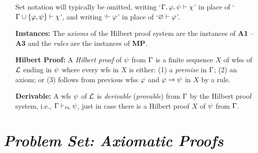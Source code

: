 \documentclass[a4paper, 11pt]{article} %
\begin{document}
\begin{enumerate}[leftmargin=1.2in,labelsep=.15in]
\begin{itemize}[leftmargin=.5in]
    \end{itemize}
    Set notation will typically be omitted, writing `$\Gamma, \varphi, \psi \vdash \chi$' in place of `$\Gamma\cup\lbrace\varphi,\psi\rbrace \vdash \chi$', and writing `$\vdash \varphi$' in place of `$\varnothing \vdash\varphi$'.
    \item[\bf Instances:] The \textit{axioms} of the Hilbert proof system are the instances of \textbf{A1} -- \textbf{A3} and the \textit{rules} are the instances of \textbf{MP}.
    \item[\bf Hilbert Proof:] A \textit{Hilbert proof} of $\psi$ from $\Gamma$ is a finite sequence $X$ of wfss of $\mathcal{L}$ ending in $\psi$ where every wfs in $X$ is either: (1) a \textit{premise} in $\Gamma$; (2) an axiom; or (3) follows from previous wfss $\varphi$ and $\varphi \rightarrow \psi$ in $X$ by a rule.
    \item[\bf Derivable:]
      A wfs $\psi$ of $\mathcal{L}$ is \textit{derivable} (\textit{provable}) from $\Gamma$ by the Hilbert proof system, i.e., $\Gamma \vdash_{\textsc{pl}} \psi$, just in case there is a Hilbert proof $X$ of $\psi$ from $\Gamma$.
\end{enumerate}


\section*{\it Problem Set: Axiomatic Proofs}
\end{document}

